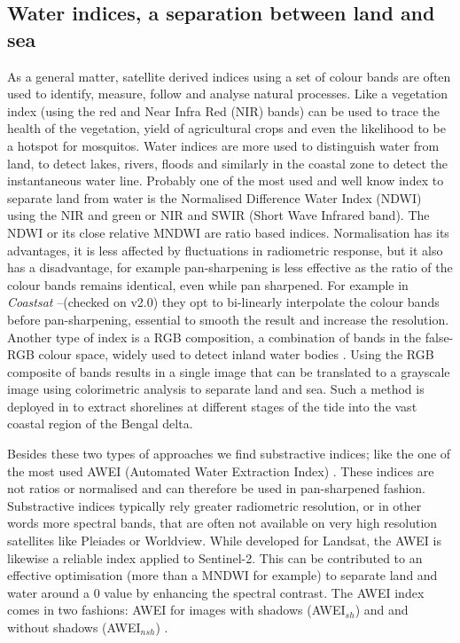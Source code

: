 \documentclass[remotesensing,article,submit,pdftex,moreauthors]{Definitions/mdpi}
\begin{document}
\subsection{Water indices, a separation between land and sea}
As a general matter, satellite derived indices using a set of colour bands are often used to identify, measure, follow and analyse natural processes. Like a vegetation index (using the red and Near Infra Red (NIR) bands) can be used to trace the health of the vegetation, yield of agricultural crops and even the likelihood to be a hotspot for mosquitos. Water indices are more used to distinguish water from land, to detect lakes, rivers, floods and similarly in the coastal zone to detect the instantaneous water line. Probably one of the most used and well know index to separate land from water is the Normalised Difference Water Index (NDWI) using the NIR and green or NIR and SWIR (Short Wave Infrared band). The NDWI or its close relative MNDWI are ratio based indices. Normalisation has its advantages, it is less affected by fluctuations in radiometric response, but it also has a disadvantage, for example pan-sharpening is less effective as the ratio of the colour bands remains identical, even while pan sharpened. For example in \textit{Coastsat} --(checked on v2.0) they opt to bi-linearly interpolate the colour bands before pan-sharpening, essential to smooth the result and increase the resolution. Another type of index is a RGB composition, a combination of bands in the false-RGB colour space, widely used to detect inland water bodies \citep{PEKEL2014704}. Using the RGB composite of bands results in a single image that can be translated to a grayscale image using colorimetric analysis to separate land and sea. Such a method is deployed in \citet{Khan2019} to extract shorelines at different stages of the tide into the vast coastal region of the Bengal delta. 

Besides these two types of approaches we find substractive indices; like the one of the most used AWEI (Automated Water Extraction Index) \citep{FEYISA201423}. These indices are not ratios or normalised and can therefore be used in pan-sharpened fashion. Substractive indices typically rely greater radiometric resolution, or in other words more spectral bands, that are often not available on very high resolution satellites like Pleiades or Worldview. While developed for Landsat, the AWEI is likewise a reliable index applied to Sentinel-2. This can be contributed to an effective optimisation (more than a MNDWI for example) to separate land and water around a 0 value by enhancing the spectral contrast. The AWEI index comes in two fashions: AWEI for images with shadows (AWEI$_{sh}$) and and without shadows (AWEI$_{nsh}$) \citep{FEYISA201423}.
\end{document}
